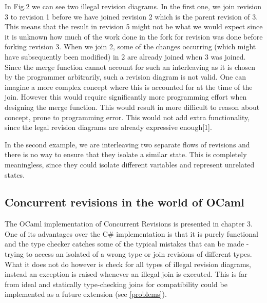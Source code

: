 \documentclass[12pt,twoside,notitlepage]{report}
\begin{document}
In Fig.2 we can see two illegal revision diagrams. In the first one, we join revision 3 to revision 1 before we have joined revision 2 which is the parent revision of 3. This means that the result in revision 5 might not be what we would expect since it is unknown how much of the work done in the fork for revision was done before forking revision 3. When we join 2, some of the changes occurring (which might have subsequently been modified) in 2 are already joined when 3 was joined. Since the merge function cannot account for such an interleaving as it is chosen by the programmer arbitrarily, such a revision diagram is not valid. One can imagine a more complex concept where this is accounted for at the time of the join. However this would require significantly more programming effort when designing the merge function. This would result in more difficult to reason about concept, prone to programming error. This would not add extra functionality, since the legal revision diagrams are already expressive enough[1]. 

In the second example, we are interleaving two separate flows of revisions and there is no way to ensure that they isolate a similar state. This is completely meaningless, since they could isolate different variables and represent unrelated states.

\subsection{Concurrent revisions in the world of OCaml}

\label{rev_in_ocaml}
The OCaml implementation of Concurrent Revisions is presented in chapter 3. One of its advantages over the C\# implementation is that it is purely functional and the type checker catches some of the typical mistakes that can be made - trying to access an isolated of a wrong type or join revisions of different types. What it does not do however is check for all types of illegal revision diagrams, instead an exception is raised whenever an illegal join is executed. This is far from ideal and statically type-checking joins for compatibility could be implemented as a future extension (see \ref{problems}).
\end{document}

